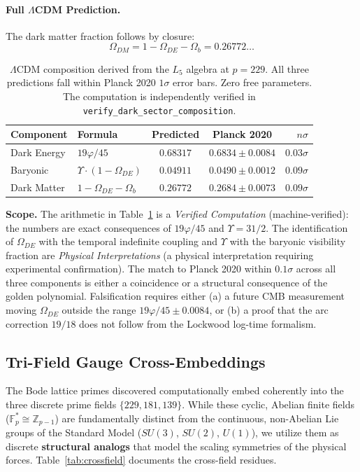 \paragraph{Full $\Lambda$CDM Prediction.}
The dark matter fraction follows by closure:
\begin{equation}\label{eq:dark_matter}
    \Omega_{DM} = 1 - \Omega_{DE} - \Omega_b = 0.26772\ldots
\end{equation}

\begin{table}[ht]
\centering
\renewcommand{\arraystretch}{1.3}
\begin{tabular}{@{}llccr@{}}
\toprule
\textbf{Component} & \textbf{Formula} & \textbf{Predicted} & \textbf{Planck 2020} & \textbf{$n\sigma$} \\
\midrule
Dark Energy & $19\varphi/45$ & $0.68317$ & $0.6834 \pm 0.0084$ & $0.03\sigma$ \\
Baryonic & $\Upsilon \cdot (1 - \Omega_{DE})$ & $0.04911$ & $0.0490 \pm 0.0012$ & $0.09\sigma$ \\
Dark Matter & $1 - \Omega_{DE} - \Omega_b$ & $0.26772$ & $0.2684 \pm 0.0073$ & $0.09\sigma$ \\
\bottomrule
\end{tabular}
\caption{$\Lambda$CDM composition derived from the $L_5$ algebra at $p = 229$. All three predictions fall within Planck 2020 $1\sigma$ error bars. Zero free parameters. The computation is independently verified in \texttt{verify\_dark\_sector\_composition}.}
\label{tab:dark_sector}
\end{table}

\textbf{Scope.} The arithmetic in Table~\ref{tab:dark_sector} is a \emph{Verified Computation} (machine-verified): the numbers are exact consequences of $19\varphi/45$ and $\Upsilon = 31/2$. The identification of $\Omega_{DE}$ with the temporal indefinite coupling and $\Upsilon$ with the baryonic visibility fraction are \emph{Physical Interpretations} (a physical interpretation requiring experimental confirmation). The match to Planck 2020 within $0.1\sigma$ across all three components is either a coincidence or a structural consequence of the golden polynomial. Falsification requires either (a) a future CMB measurement moving $\Omega_{DE}$ outside the range $19\varphi/45 \pm 0.0084$, or (b) a proof that the arc correction $19/18$ does not follow from the Lockwood log-time formalism.

\subsection{Tri-Field Gauge Cross-Embeddings}
The Bode lattice primes discovered computationally embed coherently into the three discrete prime fields $\{229, 181, 139\}$. While these cyclic, Abelian finite fields ($\mathbb{F}_{p}^* \cong \mathbb{Z}_{p-1}$) are fundamentally distinct from the continuous, non-Abelian Lie groups of the Standard Model ($SU(3)$, $SU(2)$, $U(1)$), we utilize them as discrete \textbf{structural analogs} that model the scaling symmetries of the physical forces. Table~\ref{tab:crossfield} documents the cross-field residues.


